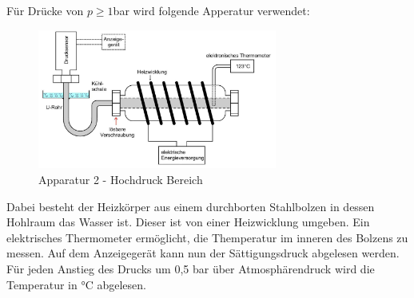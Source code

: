 Für Drücke von $p\geq 1$bar wird folgende Apperatur verwendet:
\begin{figure}
    \centering
    \includegraphics[width=0.7\textwidth]{bilder/analge2.jpg}
    \caption{Apparatur 2 - Hochdruck Bereich \cite[183]{Anleitung}}
    \label{fig:app2}
\end{figure}

Dabei besteht der Heizkörper aus einem durchborten Stahlbolzen in dessen
Hohlraum das Wasser ist. Dieser ist von einer Heizwicklung umgeben.
Ein elektrisches Thermometer ermöglicht, die Themperatur im inneren des
Bolzens zu messen.
Auf dem Anzeigegerät kann nun der Sättigungsdruck abgelesen werden.
Für jeden Anstieg des Drucks um 0,5 bar über Atmosphärendruck wird die Temperatur in °C abgelesen.


